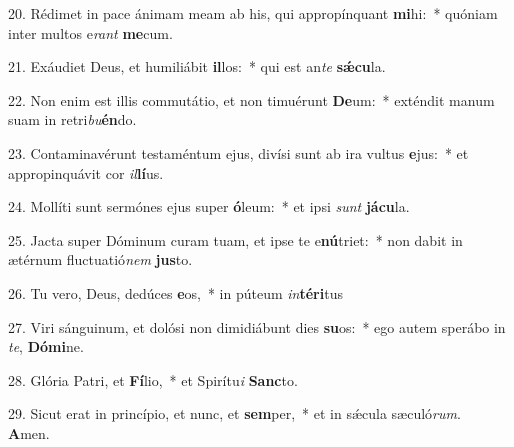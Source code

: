20. Rédimet in pace ánimam meam ab his, qui appropínquant \textbf{mi}hi:~*  quóniam inter multos e\textit{rant} \textbf{me}cum.\

21. Exáudiet Deus, et humiliábit \textbf{il}los:~*  qui est an\textit{te} \textbf{sǽ}\textbf{cu}la.\

22. Non enim est illis commutátio, et non timuérunt \textbf{De}um:~*  exténdit manum suam in retri\textit{bu}\textbf{én}do.\

23. Contaminavérunt testaméntum ejus, divísi sunt ab ira vultus \textbf{e}jus:~*  et appropinquávit cor \textit{il}\textbf{lí}us.\

24. Mollíti sunt sermónes ejus super \textbf{ó}leum:~*  et ipsi \textit{sunt} \textbf{já}\textbf{cu}la.\

25. Jacta super Dóminum curam tuam, et ipse te e\textbf{nú}triet:~*  non dabit in ætérnum fluctuatió\textit{nem} \textbf{jus}to.\

26. Tu vero, Deus, dedúces \textbf{e}os,~*  in púteum \textit{in}\textbf{tér}\textbf{i}tus\

27. Viri sánguinum, et dolósi non dimidiábunt dies \textbf{su}os:~*  ego autem sperábo in \textit{te}, \textbf{Dó}\textbf{mi}ne.\

28. Glória Patri, et \textbf{Fí}lio,~*  et Spirítu\textit{i} \textbf{Sanc}to.\

29. Sicut erat in princípio, et nunc, et \textbf{sem}per,~*  et in sǽcula sæculó\textit{rum}. \textbf{A}men.\

